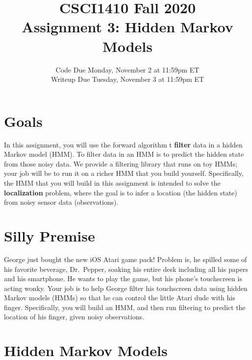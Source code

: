 \documentclass{article}
\title{CSCI1410 Fall 2020 \\
Assignment 3: Hidden Markov Models}
\date{Code Due Monday, November 2 at 11:59pm ET \\ [1ex]
Writeup Due Tuesday, November 3 at 11:59pm ET}
\begin{document}
\maketitle


\section{Goals}

In this assignment, you will use the forward algorithm t
\textbf{filter} data in a hidden Markov model (HMM).  To filter data
in an HMM is to predict the hidden state from those noisy data.  We
provide a filtering library that runs on toy HMMs; your job will be to
run it on a richer HMM that you build yourself.  Specifically, the HMM
that you will build in this assignment is intended to solve the
\textbf{localization} problem, where the goal is to infer a location
(the hidden state) from noisy sensor data (observations).


\section{Silly Premise}

George just bought the new iOS Atari game pack! Problem is, he spilled
some of his favorite beverage, Dr.\ Pepper, soaking his entire desk
including all his papers and his smartphone.  He wants to play the
game, but his phone's touchscreen is acting wonky.  Your job is to
help George filter his touchscreen data using hidden Markov models
(HMMs) so that he can control the little Atari dude with his finger.
Specifically, you will build an HMM, and then run filtering to
predict the location of his finger, given noisy observations.


\section{Hidden Markov Models}
\end{document}

